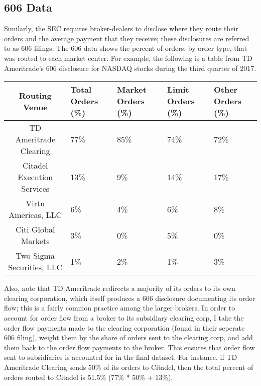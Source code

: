 \documentclass[12pt,a4paper]{article}
\begin{document}
	\pagebreak
		
	\subsection{606 Data}
	
		Similarly, the SEC requires broker-dealers to disclose where they route their orders and the average payment that they receive; these disclosures are referred to as 606 filings. The 606 data shows the percent of orders, by order type, that was routed to each market center. For example, the following is a table from TD Ameritrade's 606 disclosure for NASDAQ stocks during the third quarter of 2017. 
		\small
		\begin{center}
			\begin{singlespace}
				\begin{tabular}{| c |  C{2cm} | C{2cm} | C{2cm} | C{2cm} |}
					\hline
					\textbf{Routing Venue} & Total Orders (\%) & Market Orders (\%) & Limit Orders (\%)&  Other Orders (\%) \\ \hline
					TD Ameritrade Clearing & 77\%  & 85\% &  74\%  & 72\%   \\ \hline
					Citadel Execution Services &  13\% &  9\%  & 14\%  & 17\%   \\ \hline
					Virtu Americas, LLC  & 6\% &  4\%  & 6\%  & 8\%   \\ \hline
					Citi Global Markets  & 3\%  & 0\%  & 5\% &  0\%   \\ \hline
					Two Sigma Securities, LLC  & 1\%  & 2\%  & 1\%  & 3\%   \\ 
					\hline
				\end{tabular}
			\end{singlespace}
		\end{center}
		\normalsize
		\vspace{1em}
		Also, note that TD Ameritrade redirects a majority of its orders to its own clearing corporation, which itself produces a 606 disclosure documenting its order flow; this is a fairly common practice among the larger brokers. In order to account for order flow from a broker to its subsidiary clearing corp, I take the order flow payments made to the clearing corporation (found in their seperate 606 filing), weight them by the share of orders sent to the clearing corp, and add them back to the order flow payments to the broker. This ensures that order flow sent to subsidiaries is accounted for in the final dataset. For instance, if TD Ameritrade Clearing sends 50\% of its orders to Citadel, then the total percent of orders routed to Citadel is 51.5\% (77\% * 50\% + 13\%).  
		
\end{document}
